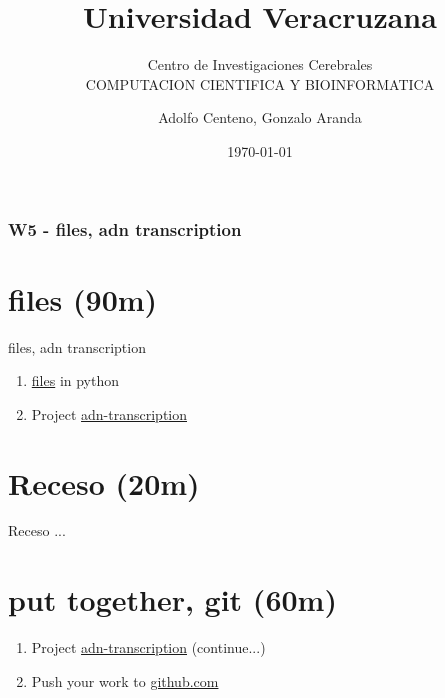 \documentclass{beamer}
\begin{document}
\title{Universidad Veracruzana}  
\subtitle{Centro de Investigaciones Cerebrales\\COMPUTACION CIENTIFICA Y BIOINFORMATICA}
\author{Adolfo Centeno, Gonzalo Aranda}
\date{\today} 

\begin{frame}
\titlepage
\end{frame}

\begin{frame}\frametitle{W5 - files, adn transcription }
\tableofcontents
\end{frame} 


\section{files (90m) }

\begin{frame}

files, adn transcription

\begin{enumerate}

\item

	\href{https://github.com/adsoftsito/python/blob/master/w5/files.py}{files} in python

\item
	Project \href{https://github.com/adsoftsito/python/blob/master/w5/adntransciption.py}{adn-transcription} 
	
\end{enumerate} 


\end{frame}


\section{Receso  (20m) }

\begin{frame}


Receso ...

\end{frame}


\section{put together,  git (60m) }

\begin{frame}

\begin{enumerate}

\item
	Project \href{https://github.com/adsoftsito/python/blob/master/w4/project1.py}{adn-transcription} (continue...)

\item
	Push your work to \href{https://github.com}{github.com}

\end{enumerate} 


\end{frame}
\end{document}
